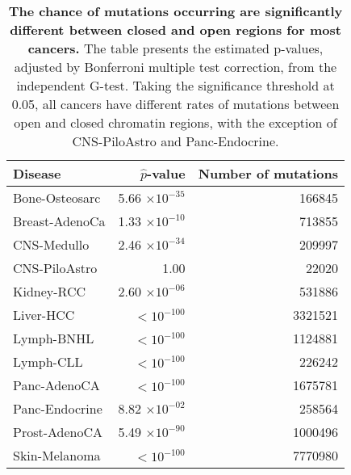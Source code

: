 \begin{table}[h]
\centering
\caption{\textbf{The chance of mutations occurring are significantly different between closed and open regions for most cancers.} The table presents the estimated p-values, adjusted by Bonferroni multiple test correction, from the independent G-test. Taking the significance threshold at 0.05, all cancers have different rates of mutations between open and closed chromatin regions, with the exception of CNS-PiloAstro and Panc-Endocrine.}
\label{tab:g-test}
\begin{tabular}{lrr}
  \toprule
 \textbf{Disease} & \textbf{$\hat{p}$-value} & \textbf{Number of mutations} \\ 
  \hline
 Bone-Osteosarc & 5.66 $\times 10^{-35}$ & 166845 \\ 
 Breast-AdenoCa & 1.33 $\times 10^{-10}$ & 713855 \\ 
 CNS-Medullo & 2.46 $\times 10^{-34}$ & 209997 \\ 
 CNS-PiloAstro & 1.00 & 22020 \\ 
 Kidney-RCC & 2.60 $\times 10^{-06}$ & 531886 \\ 
 Liver-HCC & $<10^{-100}$ & 3321521 \\ 
 Lymph-BNHL & $<10^{-100}$ & 1124881 \\ 
 Lymph-CLL & $<10^{-100}$ & 226242 \\ 
 Panc-AdenoCA & $<10^{-100}$ & 1675781 \\ 
 Panc-Endocrine & 8.82 $\times 10^{-02}$ & 258564 \\ 
 Prost-AdenoCA & 5.49 $\times 10^{-90}$ & 1000496 \\ 
 Skin-Melanoma & $<10^{-100}$ & 7770980 \\ 
   \bottomrule
\end{tabular}
\end{table}